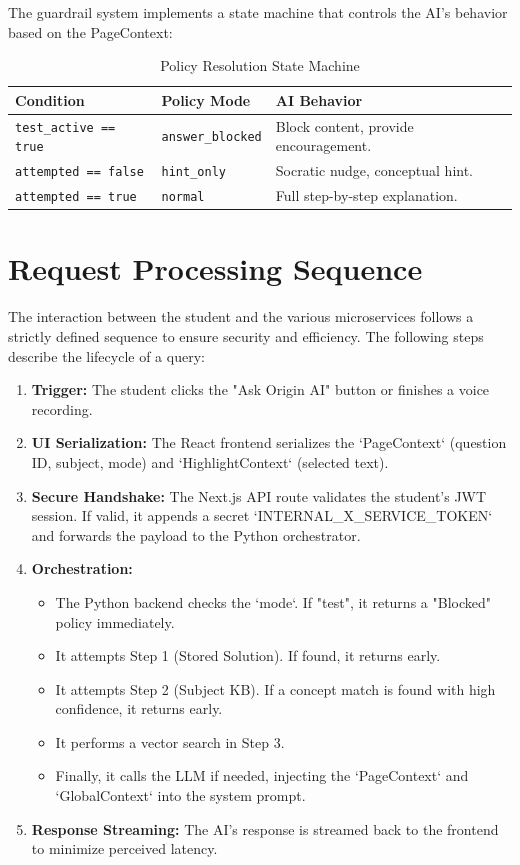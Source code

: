 The guardrail system implements a state machine that controls the AI's behavior based on the PageContext:

\begin{table}[htbp]
\centering
\caption{Policy Resolution State Machine}
\label{tab:guardrails}
\begin{tabular}{|l|l|l|}
\hline
\textbf{Condition} & \textbf{Policy Mode} & \textbf{AI Behavior} \\ \hline
\texttt{test\_active == true} & \texttt{answer\_blocked} & Block content, provide encouragement. \\ \hline
\texttt{attempted == false} & \texttt{hint\_only} & Socratic nudge, conceptual hint. \\ \hline
\texttt{attempted == true} & \texttt{normal} & Full step-by-step explanation. \\ \hline
\end{tabular}
\end{table}

\section{Request Processing Sequence}

The interaction between the student and the various microservices follows a strictly defined sequence to ensure security and efficiency. The following steps describe the lifecycle of a query:

\begin{enumerate}
    \item \textbf{Trigger:} The student clicks the "Ask Origin AI" button or finishes a voice recording.
    \item \textbf{UI Serialization:} The React frontend serializes the `PageContext` (question ID, subject, mode) and `HighlightContext` (selected text).
    \item \textbf{Secure Handshake:} The Next.js API route validates the student's JWT session. If valid, it appends a secret `INTERNAL_X_SERVICE_TOKEN` and forwards the payload to the Python orchestrator.
    \item \textbf{Orchestration:}
    \begin{itemize}
        \item The Python backend checks the `mode`. If "test", it returns a "Blocked" policy immediately.
        \item It attempts Step 1 (Stored Solution). If found, it returns early.
        \item It attempts Step 2 (Subject KB). If a concept match is found with high confidence, it returns early.
        \item It performs a vector search in Step 3.
        \item Finally, it calls the LLM if needed, injecting the `PageContext` and `GlobalContext` into the system prompt.
    \end{itemize}
    \item \textbf{Response Streaming:} The AI's response is streamed back to the frontend to minimize perceived latency.
\end{enumerate}

